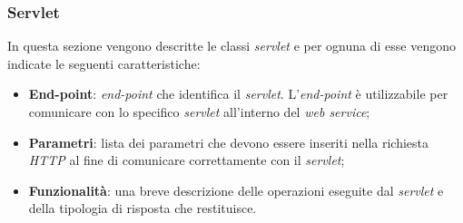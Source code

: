 \documentclass[12pt, a4paper, titlepage]{report}
\begin{document}
	\subsubsection{Servlet}
	
	In questa sezione vengono descritte le classi \textit{servlet} e per ognuna di esse vengono indicate le seguenti caratteristiche:
	\begin{itemize}
		\item \textbf{End-point}: \textit{end-point} che identifica il \textit{servlet}. L'\textit{end-point} è utilizzabile per comunicare con lo specifico \textit{servlet} all'interno del \textit{web service};
		\item \textbf{Parametri}: lista dei parametri che devono essere inseriti nella richiesta \textit{HTTP} al fine di comunicare correttamente con il \textit{servlet};
		\item \textbf{Funzionalità}: una breve descrizione delle operazioni eseguite dal \textit{servlet} e della tipologia di risposta che restituisce.
	\end{itemize}
\end{document}
